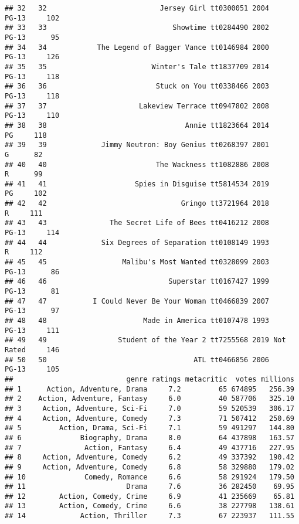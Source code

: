 \documentclass[
]{article}
\newenvironment{Shaded}{\begin{snugshade}}{\end{snugshade}}
\begin{document}
\begin{Shaded}
\begin{Highlighting}[]
\begin{verbatim}
## 32   32                           Jersey Girl tt0300051 2004     PG-13     102
## 33   33                              Showtime tt0284490 2002     PG-13      95
## 34   34            The Legend of Bagger Vance tt0146984 2000     PG-13     126
## 35   35                         Winter's Tale tt1837709 2014     PG-13     118
## 36   36                          Stuck on You tt0338466 2003     PG-13     118
## 37   37                      Lakeview Terrace tt0947802 2008     PG-13     110
## 38   38                                 Annie tt1823664 2014        PG     118
## 39   39             Jimmy Neutron: Boy Genius tt0268397 2001         G      82
## 40   40                          The Wackness tt1082886 2008         R      99
## 41   41                     Spies in Disguise tt5814534 2019        PG     102
## 42   42                                Gringo tt3721964 2018         R     111
## 43   43               The Secret Life of Bees tt0416212 2008     PG-13     114
## 44   44             Six Degrees of Separation tt0108149 1993         R     112
## 45   45                  Malibu's Most Wanted tt0328099 2003     PG-13      86
## 46   46                             Superstar tt0167427 1999     PG-13      81
## 47   47           I Could Never Be Your Woman tt0466839 2007     PG-13      97
## 48   48                       Made in America tt0107478 1993     PG-13     111
## 49   49                 Student of the Year 2 tt7255568 2019 Not Rated     146
## 50   50                                   ATL tt0466856 2006     PG-13     105
##                           genre ratings metacritic  votes millions
## 1      Action, Adventure, Drama     7.2         65 674895   256.39
## 2    Action, Adventure, Fantasy     6.0         40 587706   325.10
## 3     Action, Adventure, Sci-Fi     7.0         59 520539   306.17
## 4     Action, Adventure, Comedy     7.3         71 507412   250.69
## 5         Action, Drama, Sci-Fi     7.1         59 491297   144.80
## 6              Biography, Drama     8.0         64 437898   163.57
## 7               Action, Fantasy     6.4         49 437716   227.95
## 8     Action, Adventure, Comedy     6.2         49 337392   190.42
## 9     Action, Adventure, Comedy     6.8         58 329880   179.02
## 10              Comedy, Romance     6.6         58 291924   179.50
## 11                        Drama     7.6         36 282450    69.95
## 12        Action, Comedy, Crime     6.9         41 235669    65.81
## 13        Action, Comedy, Crime     6.6         38 227798   138.61
## 14             Action, Thriller     7.3         67 223937   111.55

\end{verbatim}
\end{Highlighting}
\end{Shaded}
\end{document}
